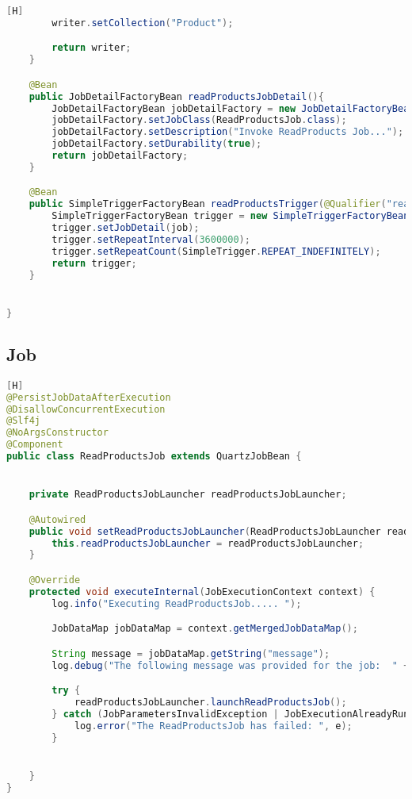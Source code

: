 \begin{lstlisting}[language=JAVA,caption=ProductBatchConfig.java][H]
        writer.setCollection("Product");

        return writer;
    }

    @Bean
    public JobDetailFactoryBean readProductsJobDetail(){
        JobDetailFactoryBean jobDetailFactory = new JobDetailFactoryBean();
        jobDetailFactory.setJobClass(ReadProductsJob.class);
        jobDetailFactory.setDescription("Invoke ReadProducts Job...");
        jobDetailFactory.setDurability(true);
        return jobDetailFactory;
    }

    @Bean
    public SimpleTriggerFactoryBean readProductsTrigger(@Qualifier("readProductsJobDetail") JobDetail job){
        SimpleTriggerFactoryBean trigger = new SimpleTriggerFactoryBean();
        trigger.setJobDetail(job);
        trigger.setRepeatInterval(3600000);
        trigger.setRepeatCount(SimpleTrigger.REPEAT_INDEFINITELY);
        return trigger;
    }


}
\end{lstlisting}

\subsection{Job}
\begin{lstlisting}[language=JAVA,caption=ReadProductsJob.java][H]
@PersistJobDataAfterExecution
@DisallowConcurrentExecution
@Slf4j
@NoArgsConstructor
@Component
public class ReadProductsJob extends QuartzJobBean {


    private ReadProductsJobLauncher readProductsJobLauncher;

    @Autowired
    public void setReadProductsJobLauncher(ReadProductsJobLauncher readProductsJobLauncher) {
        this.readProductsJobLauncher = readProductsJobLauncher;
    }

    @Override
    protected void executeInternal(JobExecutionContext context) {
        log.info("Executing ReadProductsJob..... ");

        JobDataMap jobDataMap = context.getMergedJobDataMap();

        String message = jobDataMap.getString("message");
        log.debug("The following message was provided for the job:  " + message);

        try {
            readProductsJobLauncher.launchReadProductsJob();
        } catch (JobParametersInvalidException | JobExecutionAlreadyRunningException | JobRestartException | JobInstanceAlreadyCompleteException e) {
            log.error("The ReadProductsJob has failed: ", e);
        }


    }
}
\end{lstlisting}

